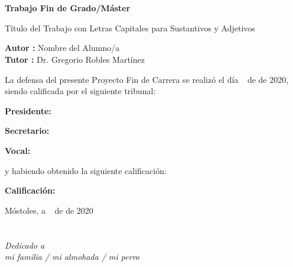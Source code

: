 \documentclass[a4paper, 12pt]{book}
\begin{document}
\newpage
\mbox{}
\thispagestyle{empty} %


\clearpage
{}
\chapter*{}

\vspace{-4cm}
\begin{center}
\LARGE
\textbf{Trabajo Fin de Grado/Máster}

\vspace{1cm}
\large
Título del Trabajo con Letras Capitales para Sustantivos y Adjetivos

\vspace{1cm}
\large
\textbf{Autor :} Nombre del Alumno/a \\
\textbf{Tutor :} Dr. Gregorio Robles Martínez

\end{center}

\vspace{1cm}
La defensa del presente Proyecto Fin de Carrera se realizó el día \qquad$\;\,$ de \qquad\qquad\qquad\qquad \newline de 2020, siendo calificada por el siguiente tribunal:


\vspace{0.5cm}
\textbf{Presidente:}

\vspace{1.2cm}
\textbf{Secretario:}

\vspace{1.2cm}
\textbf{Vocal:}


\vspace{1.2cm}
y habiendo obtenido la siguiente calificación:

\vspace{1cm}
\textbf{Calificación:}


\vspace{1cm}
\begin{flushright}
Móstoles, a \qquad$\;\,$ de \qquad\qquad\qquad\qquad de 2020
\end{flushright}


\chapter*{}
\begin{flushright}
\textit{Dedicado a \\
mi familia / mi almohada / mi perro}
\end{flushright}
\end{document}
